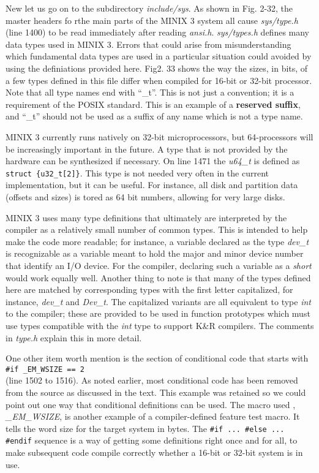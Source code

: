 \documentclass{book}
\newcommand {\kw}  [1] {\textbf{#1}}
\newcommand {\sys} [1] {\textsl{#1}}
\newcommand {\cmd} [1] {\texttt{#1}}
\begin{document}
New let us go on to the subdirectory \sys{include/sys}.
As shown in Fig. 2-32, the master headers fo rthe main parts of the MINIX 3 system 
all cause \sys{sys/type.h} (line 1400) to be read immediately after reading \sys{ansi.h}.
\sys{sys/types.h} defines many data types used in MINIX 3.
Errors 
that could arise from misunderstanding which fundamental data types are used in a particular situation 
could avoided by using the definiations provided here.
Fig2. 33 shows the way the sizes, in bits, of a few types defined in this file differ when compiled for 16-bit or 32-bit processor.
Note that all type names end with ``\_t''. 
This is not just a convention; it is a requirement of the POSIX standard.
This is an example of a \kw{reserved suffix},
and ``\_t'' should not be used as a suffix of any name which is not a type name.

MINIX 3 currently runs natively on 32-bit microprocessors, but 64-processors will be increasingly important in the future.
A type that is not provided by the hardware  can be synthesized if necessary.
On line 1471 the \sys{u64\_t} is defined as \cmd{struct \{u32\_t[2]\}}.
This type is not needed very often in the current implementation, but it can be useful.
For instance, all disk and partition data (offsets and sizes) is tored as 64 bit numbers,
allowing for very large disks.

MINIX 3 uses many type definitions
that ultimately are interpreted by the compiler as a relatively small number of common types.
This is intended to help make the code more readable;
for instance, a variable declared as the type \sys{dev\_t} is recognizable as a variable meant to hold the major and minor device number
that identify an I/O device.
For the compiler, declaring such a variable as a \sys{short} would work equally well.
Another thing to note is that many of the types defined here are matched by corresponding types with the first letter capitalized,
for instance, \sys{dev\_t} and \sys{Dev\_t}.
The capitalized variants are all equivalent to type \sys{int} to the compiler;
these are provided to be used in function prototypes which must use types compatible with the \sys{int} type to support K\&R compilers.
The comments in \sys{type.h} explain this in more detail.

One other item worth mention is the section of conditional code that starts with\\
\cmd{\#if \_EM\_WSIZE == 2}\\
(line 1502 to 1516).
As noted earlier, most conditional code has been removed from the source as discussed in the text.
This example was retained so we could point out one way that conditional definitions can be used.
The macro used , \sys{\_EM\_WSIZE}, is another example of a compiler-defined feature test macro.
It tells the word size for the target system in bytes.
The \cmd{\#if ... \#else ... \#endif} sequence is a way of getting some definitions right once and for all,
to make subsequent code compile correctly whether a 16-bit or 32-bit system is in use.
\end{document}
